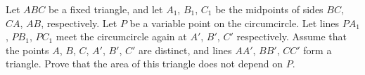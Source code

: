 Let $ABC$ be a fixed triangle, and let $A_1$, $B_1$, $C_1$ be the midpoints of sides $BC$, $CA$, $AB$, respectively. Let $P$ be a variable point on the circumcircle. Let lines $PA_1$, $PB_1$, $PC_1$ meet the circumcircle again at $A'$, $B'$, $C'$ respectively. Assume that the points $A$, $B$, $C$, $A'$, $B'$, $C'$ are distinct, and lines $AA'$, $BB'$, $CC'$ form a triangle. Prove that the area of this triangle does not depend on $P$.
